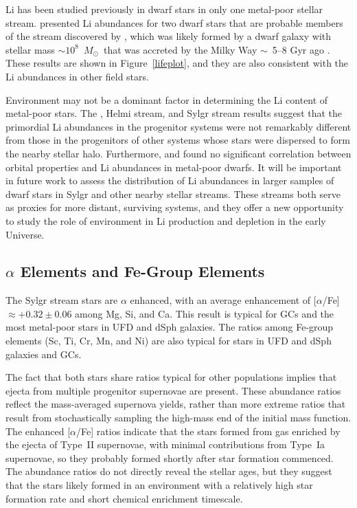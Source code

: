 \documentclass[twocolumn,tighten]{aastex62}
\newcommand{\msun}{\mbox{$M_{\odot}$}}
\begin{document}
Li has been studied previously in dwarf stars in only
one metal-poor stellar stream.
\citet{roederer10a} presented Li abundances for
two dwarf stars that are probable 
members of the stream discovered by \citet{helmi99},
which was likely formed by a dwarf galaxy
with stellar mass $\sim 10^{8}$~\msun\
that was accreted by the Milky Way $\sim$~5--8 Gyr ago
\citep{koppelman19}.
These results are shown in Figure~\ref{lifeplot},
and they are also consistent with the Li abundances 
in other field stars.

Environment may not be a dominant factor in determining 
the Li content of metal-poor stars.
The ,
Helmi stream, and Sylgr stream results
suggest that the primordial Li abundances in the progenitor 
systems were not remarkably different from those in the progenitors of
other systems whose stars were dispersed to form the nearby stellar halo.
Furthermore,
\citet{boesgaard05} and \citet{aoki09li}
found no significant correlation between orbital properties
and Li abundances in metal-poor dwarfs.
It will be important in future work
to assess the distribution
of Li abundances in larger samples of dwarf stars in Sylgr and 
other nearby stellar streams.
These streams both serve
as proxies for more distant, surviving systems, 
and they offer a new opportunity to study
the role of environment in Li production and depletion
in the early Universe.


\subsection{$\alpha$ Elements and Fe-Group Elements}
\label{cluesalphafe}


The Sylgr stream stars are $\alpha$ enhanced, with an average
enhancement of
[$\alpha$/Fe]~$\approx +0.32 \pm 0.06$
among Mg, Si, and Ca.
This result is typical for GCs and
the most metal-poor stars in 
UFD and dSph galaxies.
The ratios among Fe-group elements
(Sc, Ti, Cr, Mn, and Ni) are also typical 
for stars in UFD and dSph galaxies and GCs.~

The fact that both stars share ratios typical for other populations
implies that ejecta 
from multiple progenitor supernovae are present.
These abundance ratios reflect the mass-averaged supernova yields, 
rather than more extreme ratios that
result from stochastically sampling the high-mass end of the
initial mass function.
The enhanced [$\alpha$/Fe] ratios indicate 
that the stars formed
from gas enriched by the ejecta of 
Type~II supernovae, with minimal contributions
from Type~Ia supernovae,
so they probably formed shortly 
after star formation commenced.
The abundance ratios
do not directly reveal the stellar ages,
but they suggest that the stars
likely formed in an environment with a relatively
high star formation rate and short chemical enrichment timescale.
\end{document}
